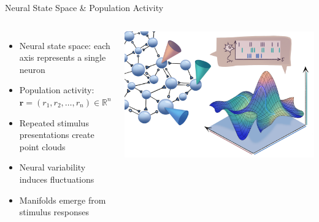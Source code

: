 \documentclass[aspectratio=169]{beamer}
\begin{document}
\begin{frame}{Neural State Space \& Population Activity}
    \begin{columns}
        \begin{itemize}
            \item Neural state space: each axis represents a single neuron
            \item Population activity: $\mathbf{r} = (r_1, r_2, \ldots, r_n) \in \mathbb{R}^n$
            \item Repeated stimulus presentations create point clouds
            \item Neural variability induces fluctuations
            \item Manifolds emerge from stimulus responses
        \end{itemize}
        
        \includegraphics[width=\textwidth]{figs/manifold_schematic.png}
    \end{columns}
\end{frame}
\end{document}
